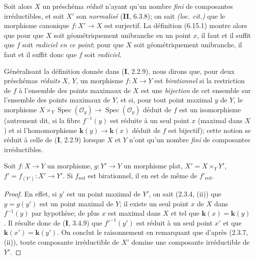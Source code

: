 Soit alors $X$ un préschéma \emph{réduit} n'ayant qu'un nombre \emph{fini} de
composantes irréductibles, et soit $X'$ son \emph{normalisé} (\textbf{II}, 6.3.8); on sait
\emph{(loc. cit.)} que le morphisme canonique $f:X'\to X$ est surjectif. La
définition (6.15.1) montre alors que pour que $X$ soit géométriquement
unibranche en un point $x$, il faut et il suffit que $f$ soit \emph{radiciel en ce
point}; pour que $X$ soit géométriquement unibranche, il faut et il suffit
donc que $f$ soit \emph{radiciel}.

\begin{env}[6.15.4]
Généralisant la définition donnée dans (\textbf{I}, 2.2.9), nous dirons que, pour
deux préschémas \emph{réduits} $X$, $Y$, un morphisme $f:X\to Y$ est
\emph{birationnel} si la restriction de $f$ à l'ensemble des points
maximaux de $X$ est une \emph{bijection} de cet ensemble sur l'ensemble des points
maximaux de $Y$, et si, pour tout point maximal $y$ de $Y$, le morphisme
$X\times_Y\operatorname{Spec}(\mathcal O_y)\to\operatorname{Spec}(\mathcal O_y)$ déduit de
$f$ est un isomorphisme (autrement dit, si la fibre $f^{-1}(y)$ est réduite
à un seul point $x$ (maximal dans $X$) et si l'homomorphisme
$\boldsymbol{k}(y)\to \boldsymbol{k}(x)$ déduit de $f$ est bijectif); cette notion se réduit à celle
de (\textbf{I}, 2.2.9) lorsque $X$ et $Y$ n'ont qu'un nombre \emph{fini} de composantes
irréductibles.
\end{env}

\begin{lemma}[6.15.4.1]
\label{IV.2.s6.15.4.1-fr}
Soit $f:X\to Y$ un morphisme, $g:Y'\to Y$ un morphisme plat,
$X'=X\times_Y Y'$, $f'=f_{(Y')}:X'\to Y'$. Si $f_{\mathrm{red}}$ est
birationnel, il en est de même de $f'_{\mathrm{red}}$.
\end{lemma}

\begin{proof}
En effet, si $y'$ est un point maximal de $Y'$, on sait (2.3.4, (ii)) que
$y=g(y')$ est un point maximal de $Y$; il existe un seul point $x$ de $X$
dans $f^{-1}(y)$ par hypothèse; de plus $x$ est maximal dans $X$ et tel que
$\boldsymbol{k}(x)=\boldsymbol{k}(y)$. Il résulte donc de (\textbf{I}, 3.4.9) que $f'^{-1}(y')$ est réduit à
un seul point $x'$ et que $\boldsymbol{k}(x')=\boldsymbol{k}(y')$. On conclut le raisonnement en
remarquant que d'après (2.3.7, (ii)), toute composante irréductible de $X'$
domine une composante irréductible de $Y'$.
\end{proof}

